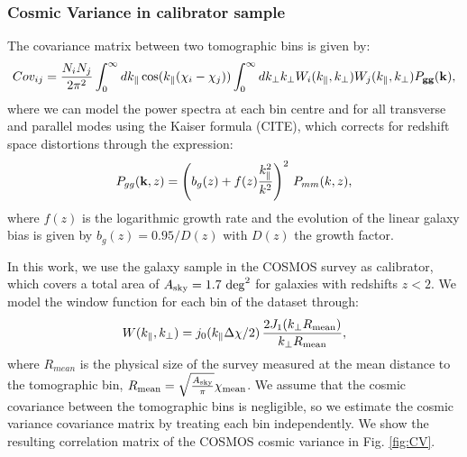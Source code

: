 \documentclass[a4paper,11pt]{article}
\begin{document}
\subsubsection{Cosmic Variance in calibrator sample}
The covariance matrix between two tomographic bins is given by:
\begin{equation}
Cov_{ij}=\frac{N_i N_j}{2\pi^2} \int_0^\infty dk_\parallel \cos(k_\parallel(\chi_i-\chi_j))\int_0^\infty dk_\perp k_\perp W_i(k_\parallel,k_\perp)W_j(k_\parallel,k_\perp)P_{\bf gg}({\bf k}),
\end{equation}
where we can model the power spectra at each bin centre and for all
transverse and parallel modes using the Kaiser formula (CITE), which corrects for redshift space distortions through
the expression:
\begin{equation}
P_{gg}({\bf k},z)=\left(b_g(z)+f(z)\frac{k_\parallel^2}{k^2}\right)^2\,P_{mm}(k,z),
\end{equation}
where $f(z)$ is
the logarithmic growth
rate
and the
evolution of the linear galaxy bias is given by $b_g(z) = 0.95/D(z)$
with $D(z)$ the growth factor.

In this work, we use the galaxy sample in the COSMOS survey as calibrator, which
covers a total area of
$A_{\rm sky} = 1.7 \ {\rm deg}^2$ for galaxies with redshifts $z < 2$.
We model the window function for each bin of the dataset through:
\begin{equation}
W(k_\parallel,k_\perp)=j_0(k_\parallel\Delta\chi/2)\,\frac{2 J_1(k_\perp R_{\rm mean})}{k_\perp R_{\rm mean}},
\end{equation}
where $R_{mean}$ is the
physical size of the survey measured at the mean
distance to the
tomographic bin, 
$R_{\rm mean} = 
\sqrt{\frac{A_{\rm sky}}{\pi}} \chi_{\rm mean}$.
We assume that the
cosmic covariance
between the tomographic bins is negligible, so we estimate the cosmic variance covariance matrix by
treating each bin independently. We show the resulting correlation matrix of the COSMOS cosmic variance in Fig. \ref{fig:CV}.
\end{document}
